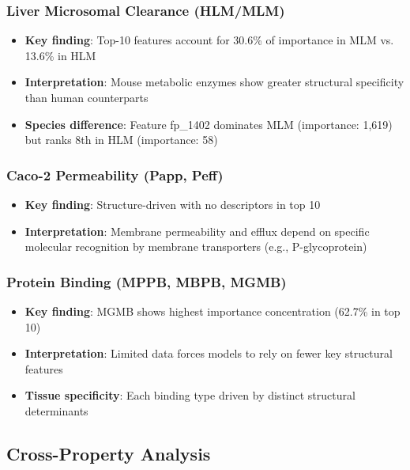 \documentclass[11pt,a4paper]{article}
\begin{document}
\subsubsection{Liver Microsomal Clearance (HLM/MLM)}

\begin{itemize}
    \item \textbf{Key finding}: Top-10 features account for 30.6\% of importance in MLM vs. 13.6\% in HLM
    \item \textbf{Interpretation}: Mouse metabolic enzymes show greater structural specificity than human counterparts
    \item \textbf{Species difference}: Feature fp\_1402 dominates MLM (importance: 1,619) but ranks 8th in HLM (importance: 58)
\end{itemize}

\subsubsection{Caco-2 Permeability (Papp, Peff)}

\begin{itemize}
    \item \textbf{Key finding}: Structure-driven with no descriptors in top 10
    \item \textbf{Interpretation}: Membrane permeability and efflux depend on specific molecular recognition by membrane transporters (e.g., P-glycoprotein)
\end{itemize}

\subsubsection{Protein Binding (MPPB, MBPB, MGMB)}

\begin{itemize}
    \item \textbf{Key finding}: MGMB shows highest importance concentration (62.7\% in top 10)
    \item \textbf{Interpretation}: Limited data forces models to rely on fewer key structural features
    \item \textbf{Tissue specificity}: Each binding type driven by distinct structural determinants
\end{itemize}

\subsection{Cross-Property Analysis}
\end{document}

